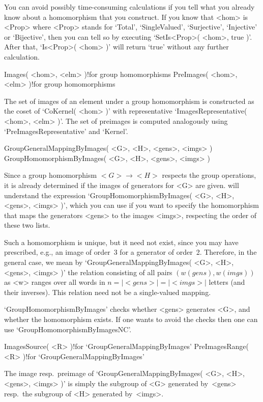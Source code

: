 You  can  avoid possibly time-consuming  calculations  if you tell {\GAP}
what you already  know  about a  homomorphism that you  construct. If you
know   that   <hom> is    <Prop>    where  <Prop>  stands   for  `Total',
`SingleValued', `Surjective',  `Injective'  or `Bijective', then  you can
tell {\GAP}  so by  executing `SetIs<Prop>( <hom>,   true )'. After that,
`Is<Prop>( <hom> )' will return `true' without any further calculation.

\>Images( <hom>, <elm> )!{for group homomorphisms}
\>PreImages( <hom>, <elm> )!{for group homomorphisms}

The set of images of an element under a group homomorphism is constructed
as  the     coset    of  `CoKernel( <hom>     )'      with representative
`ImagesRepresentative( <hom>, <elm> )'. The  set of preimages is computed
analogously using `PreImagesRepresentative' and `Kernel'.

\stars

\>GroupGeneralMappingByImages( <G>, <H>, <gens>, <imgs> )
\>GroupHomomorphismByImages( <G>, <H>, <gens>, <imgs> )

Since a group homomorphism $<G>\to <H>$ respects the group operations, it
is already determined if the images of generators for <G> are given.
{\GAP}  will  understand  the  expression
`GroupHomomorphismByImages(  <G>, <H>, <gens>,   <imgs> )', which you can
use if  you  want to specify  the homomorphism  that maps  the generators
<gens> to the  images <imgs>, respecting  the  order of these  two lists.

Such a homomorphism is unique, but it need not  exist, since you may have
prescribed,  e.g., an  image of    order~3  for a generator  of  order~2.
Therefore, in the  general case, we mean by `GroupGeneralMappingByImages(
<G>,   <H>, <gens>,  <imgs>   )' the  relation   consisting of  all pairs
$(w(gens),      w(imgs))$   as   <w>     ranges   over    all    words in
$n=|<gens>|=|<imgs>|$  letters (and  their  inverses). This relation need
not be a single-valued mapping.

`GroupHomomorphismByImages' checks whether <gens> generates <G>, and
whether the homomorphism exists.  If one wants to avoid the checks then
one can use `GroupHomomorphismByImagesNC'.

\>ImagesSource( <R> )!{for `GroupGeneralMappingByImages'}
\>PreImagesRange( <R> )!{for `GroupGeneralMappingByImages'}

The   image resp.~preimage   of  `GroupGeneralMappingByImages(  <G>, <H>,
<gens>, <imgs> )' is  simply   the subgroup  of <G>  generated  by~<gens>
resp.~the subgroup of <H> generated by~<imgs>.

